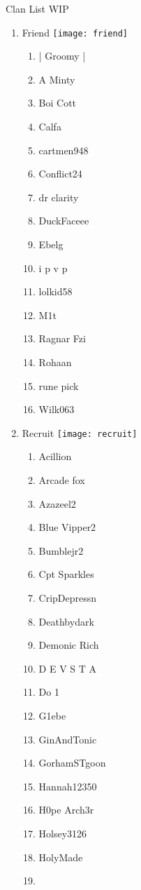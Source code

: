 \documentclass{article}
\begin{document}
Clan List WIP
\begin{enumerate}[I]
  \item 
    Friend \texttt{[image: friend]}
    \begin{enumerate}[I]
      \item
	| Groomy |
      \item
	A Minty
      \item
	Boi Cott
      \item
	Calfa
      \item
	cartmen948
      \item
	Conflict24
      \item
	dr clarity
      \item
	DuckFaceee
      \item
	Ebelg
      \item
	i p v p
      \item
	lolkid58
      \item
	M1t
      \item
	Ragnar Fzi
      \item
	Rohaan
      \item
	rune pick
      \item
	Wilk063
    \end{enumerate}
  \item
    Recruit \texttt{[image: recruit]}
    \begin{enumerate}[I]
      \item 
	Acillion
      \item
	Arcade fox
      \item
	Azazeel2
      \item
	Blue Vipper2
      \item
	Bumblejr2
      \item
	Cpt Sparkles
      \item
	CripDepressn
      \item
	Deathbydark
      \item
	Demonic Rich
      \item
	D E V S T A
      \item
	Do 1
      \item
	G1ebe
      \item
	GinAndTonic
      \item
	GorhamSTgoon
      \item
	Hannah12350
      \item
	H0pe Arch3r
      \item
	Holsey3126
      \item
	HolyMade
      \item

\end{enumerate}
\end{enumerate}
\end{document}
